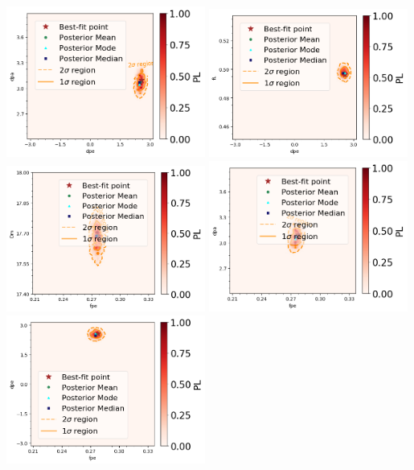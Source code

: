 \begin{center}
\includegraphics[width=0.49\textwidth]{figs/dpe_vs_dpa.png}
\includegraphics[width=0.49\textwidth]{figs/dpe_vs_fL.png}\\
\includegraphics[width=0.49\textwidth]{figs/fpe_vs_Dm.png}
\includegraphics[width=0.49\textwidth]{figs/fpe_vs_dpa.png}\\
\includegraphics[width=0.49\textwidth]{figs/fpe_vs_dpe.png}

\end{center}
